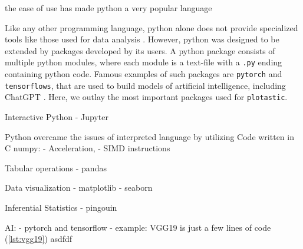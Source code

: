 the ease of use has made python a very popular language~\cite{rayhanRisePythonSurvey2023}

Like any other programming language, python alone does not provide specialized
tools like those used for data analysis \cite{PythonLanguageReference}. However,
python was designed to be extended by packages developed by its users. A python
package consists of multiple python modules, where each module is a text-file
with a \texttt{.py} ending containing python code. Famous examples of such
packages are \texttt{pytorch} and \texttt{tensorflows}, that are used to build
models of artificial intelligence, including ChatGPT
\cite{paszkePyTorchImperativeStyle2019, abadiTensorFlowLargeScaleMachine2016,
    radfordLanguageModelsAre2019}. Here, we outlay the most important packages used
for \texttt{plotastic}.



Interactive Python
- Jupyter

Python overcame the issues of interpreted language by utilizing Code
written in C
numpy:
- Acceleration,
- SIMD instructions

Tabular operations
- pandas

Data visualization
- matplotlib
- seaborn


Inferential Statistics
- pingouin

AI:
- pytorch and tensorflow
- example: VGG19 is just a few lines of code (\autoref{lst:vgg19}) asdfdf


